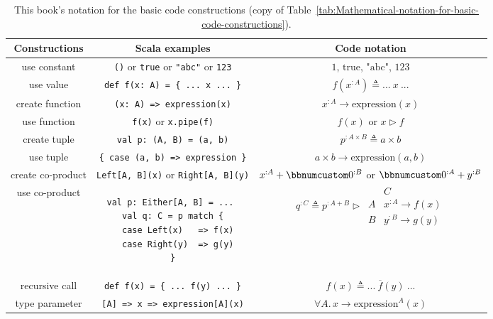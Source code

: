 \begin{table}
\begin{centering}
\begin{tabular}{|c|c|c|}
\hline 
\textbf{\small{}Constructions} & \textbf{\small{}Scala examples} & \textbf{\small{}Code notation}\tabularnewline
\hline 
\hline 
{\small{}use constant} & {\small{}}\lstinline!()!{\small{} or }\lstinline!true!{\small{}
or }\lstinline!"abc"!{\small{} or }\lstinline!123! & {\small{}$1$, $\text{true}$, $\text{"abc"}$, $123$}\tabularnewline
\hline 
{\small{}use value} & {\small{}}\lstinline!def f(x: A) = { ... x ... }! & {\small{}$f(x^{:A})\triangleq...~x~...$}\tabularnewline
\hline 
{\small{}create function} & {\small{}}\lstinline!(x: A) => expression(x)! & {\small{}$x^{:A}\rightarrow\text{expression}\left(x\right)$}\tabularnewline
\hline 
{\small{}use function} & {\small{}}\lstinline!f(x)!{\small{} or }\lstinline!x.pipe(f)! & {\small{}$f(x)$ or $x\triangleright f$}\tabularnewline
\hline 
{\small{}create tuple} & {\small{}}\lstinline!val p: (A, B) = (a, b)! & {\small{}$p^{:A\times B}\triangleq a\times b$}\tabularnewline
\hline 
{\small{}use tuple} & {\small{}}\lstinline!{ case (a, b) => expression }! & {\small{}$a\times b\rightarrow\text{expression}\left(a,b\right)$}\tabularnewline
\hline 
{\small{}create co-product} & {\small{}}\lstinline!Left[A, B](x)!{\small{} or }\lstinline!Right[A, B](y)! & {\small{}$x^{:A}+\bbnum 0^{:B}$ or $\bbnum 0^{:A}+y^{:B}$}\tabularnewline
\hline 
{\small{}use co-product} & {\small{}\hspace*{-0.013\linewidth}}%
\begin{minipage}[c][1\totalheight][b]{0.33\columnwidth}%
{\small{}\vspace{0.28\baselineskip}
}
\begin{lstlisting}
val p: Either[A, B] = ... 
val q: C = p match {
  case Left(x)   => f(x)
  case Right(y)  => g(y)
}
\end{lstlisting}
{\small{}\vspace{-0.1\baselineskip}
}%
\end{minipage}{\small{} \hspace*{-0.009\linewidth}} & {\small{}$q^{:C}\triangleq p^{:A+B}\triangleright\,\begin{array}{|c||c|}
 & C\\
\hline A & x^{:A}\rightarrow f(x)\\
B & y^{:B}\rightarrow g(y)
\end{array}$}\tabularnewline
\hline 
{\small{}recursive call} & {\small{}}\lstinline!def f(x) = { ... f(y) ... }! & {\small{}$f(x)\triangleq...~\overline{f}(y)~...$}\tabularnewline
\hline 
{\small{}type parameter} & {\small{}}\lstinline![A] => x => expression[A](x)! & {\small{}$\forall A.\,x\rightarrow\text{expression}^{A}(x)$}\tabularnewline
\hline 
\end{tabular}
\par\end{centering}
\caption{\label{tab:nine-pure-code-constructions}This book\textsf{'}s notation for
the basic code constructions (copy of Table~\ref{tab:Mathematical-notation-for-basic-code-constructions}).}
\end{table}

